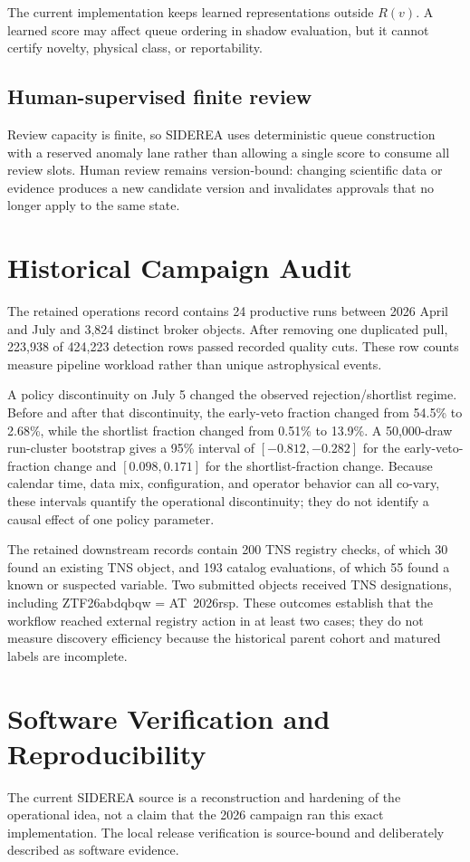 \documentclass[10pt,conference]{IEEEtran}
\begin{document}
The current implementation keeps learned representations outside $R(v)$. A learned score may affect queue ordering in shadow evaluation, but it cannot certify novelty, physical class, or reportability.

\subsection{Human-supervised finite review}
Review capacity is finite, so SIDEREA uses deterministic queue construction with a reserved anomaly lane rather than allowing a single score to consume all review slots. Human review remains version-bound: changing scientific data or evidence produces a new candidate version and invalidates approvals that no longer apply to the same state.

\section{Historical Campaign Audit}
The retained operations record contains 24 productive runs between 2026 April and July and 3,824 distinct broker objects. After removing one duplicated pull, 223,938 of 424,223 detection rows passed recorded quality cuts. These row counts measure pipeline workload rather than unique astrophysical events.

A policy discontinuity on July 5 changed the observed rejection/shortlist regime. Before and after that discontinuity, the early-veto fraction changed from 54.5\% to 2.68\%, while the shortlist fraction changed from 0.51\% to 13.9\%. A 50,000-draw run-cluster bootstrap gives a 95\% interval of $[-0.812,-0.282]$ for the early-veto-fraction change and $[0.098,0.171]$ for the shortlist-fraction change. Because calendar time, data mix, configuration, and operator behavior can all co-vary, these intervals quantify the operational discontinuity; they do not identify a causal effect of one policy parameter.

The retained downstream records contain 200 TNS registry checks, of which 30 found an existing TNS object, and 193 catalog evaluations, of which 55 found a known or suspected variable. Two submitted objects received TNS designations, including ZTF26abdqbqw = AT~2026rsp. These outcomes establish that the workflow reached external registry action in at least two cases; they do not measure discovery efficiency because the historical parent cohort and matured labels are incomplete.

\section{Software Verification and Reproducibility}
The current SIDEREA source is a reconstruction and hardening of the operational idea, not a claim that the 2026 campaign ran this exact implementation. The local release verification is source-bound and deliberately described as software evidence.
\end{document}
